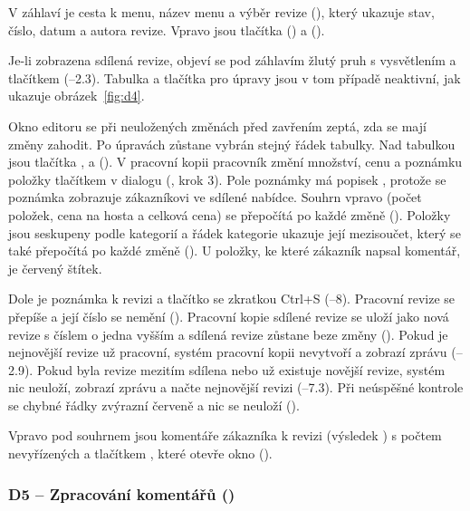 V záhlaví je cesta k menu, název menu a výběr revize (), který ukazuje stav, číslo, datum a autora revize. Vpravo jsou tlačítka  () a  ().

Je-li zobrazena sdílená revize, objeví se pod záhlavím žlutý pruh s vysvětlením a tlačítkem  (--2.3). Tabulka a tlačítka pro úpravy jsou v tom případě neaktivní, jak ukazuje obrázek~\ref{fig:d4}.

Okno editoru se při neuložených změnách před zavřením zeptá, zda se mají změny zahodit. Po úpravách zůstane vybrán stejný řádek tabulky. Nad tabulkou jsou tlačítka ,  a  (). V pracovní kopii pracovník změní množství, cenu a poznámku položky tlačítkem  v dialogu (, krok 3). Pole poznámky má popisek , protože se poznámka zobrazuje zákazníkovi ve sdílené nabídce. Souhrn vpravo (počet položek, cena na hosta a celková cena) se přepočítá po každé změně (). Položky jsou seskupeny podle kategorií a řádek kategorie ukazuje její mezisoučet, který se také přepočítá po každé změně (). U položky, ke které zákazník napsal komentář, je červený štítek.

Dole je poznámka k revizi a tlačítko  se zkratkou Ctrl+S (--8). Pracovní revize se přepíše a její číslo se nemění (). Pracovní kopie sdílené revize se uloží jako nová revize s číslem o jedna vyšším a sdílená revize zůstane beze změny (). Pokud je nejnovější revize už pracovní, systém pracovní kopii nevytvoří a zobrazí zprávu (--2.9). Pokud byla revize mezitím sdílena nebo už existuje novější revize, systém nic neuloží, zobrazí zprávu a načte nejnovější revizi (--7.3). Při neúspěšné kontrole se chybné řádky zvýrazní červeně a nic se neuloží ().

Vpravo pod souhrnem jsou komentáře zákazníka k revizi (výsledek ) s počtem nevyřízených a tlačítkem , které otevře okno  ().

\label{scr:D5}
\subsubsection*{D5 -- Zpracování komentářů ()}

